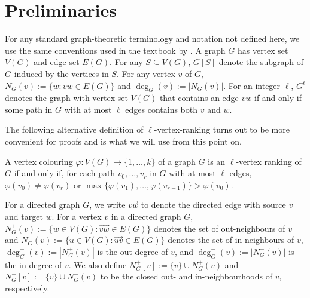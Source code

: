 \documentclass{patmorin}
\begin{document}





\section{Preliminaries}

For any standard graph-theoretic terminology and notation not defined here, we use the same conventions used in the textbook by \citet{diestel:graph}.  A graph $G$ has vertex set $V(G)$ and edge set $E(G)$.  For any $S\subseteq V(G)$, $G[S]$ denote the subgraph of $G$ induced by the vertices in $S$.  For any vertex $v$ of $G$, $N_G(v):=\{w:vw\in E(G)\}$ and $\deg_G(v):=|N_G(v)|$.  For an integer $\ell$, $G^\ell$ denotes the graph with vertex set $V(G)$ that contains an edge $vw$ if and only if some path in $G$ with at most $\ell$ edges contains both $v$ and $w$.

The following alternative definition of $\ell$-vertex-ranking turns out to be more convenient for proofs and is what we will use from this point on.
\begin{obs}\label{alternate_def}
  A vertex colouring $\varphi:V(G)\to\{1,\ldots,k\}$ of a graph $G$ is an $\ell$-vertex ranking of $G$ if and only if, for each path $v_0,\ldots,v_r$ in $G$ with at most $\ell$ edges, $\varphi(v_0)\neq \varphi(v_r)$ or $\max\{\varphi(v_1),\ldots,\varphi(v_{r-1})\}>\varphi(v_0)$.
\end{obs}

For a directed graph $G$, we write $\overrightarrow{vw}$ to denote the directed edge with source $v$ and target $w$.  For a vertex $v$ in a directed graph $G$, $N^+_{G}(v):=\{w\in V(G):\overrightarrow{vw}\in E(G)\}$ denotes the set of out-neighbours of $v$ and $N^-_G(v):=\{u\in V(G):\overrightarrow{uv}\in E(G)\}$ denotes the set of in-neighbours of $v$, $\deg^+_{G}(v):=|N^+_G(v)|$ is the out-degree of $v$, and $\deg^-_{G}(v):=|N^-_G(v)|$ is the in-degree of $v$. We also define $N^+_{G}[v]:=\{v\}\cup N^+_{G}(v)$ and $N^-_{G}[v]:=\{v\}\cup N^-_{G}(v)$ to be the closed out- and in-neighbourhoods of $v$, respectively.
\end{document}
